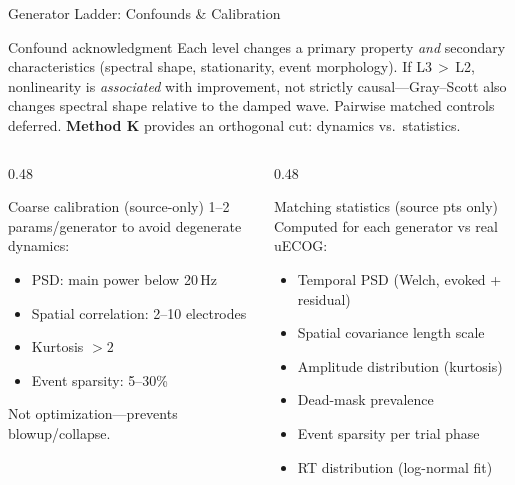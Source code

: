 \documentclass[aspectratio=169, 11pt]{beamer}
\begin{document}

\begin{frame}{Generator Ladder: Confounds \& Calibration}

\begin{alertblock}{Confound acknowledgment}
\small
Each level changes a primary property \emph{and} secondary characteristics (spectral shape, stationarity, event morphology). If L3\,$>$\,L2, nonlinearity is \emph{associated} with improvement, not strictly causal---Gray--Scott also changes spectral shape relative to the damped wave. Pairwise matched controls deferred. \textbf{Method K} provides an orthogonal cut: dynamics vs.\ statistics.
\end{alertblock}

\vspace{0.4em}

\begin{columns}[T]
\begin{column}{0.48\textwidth}
\begin{block}{\small Coarse calibration (source-only)}
\scriptsize
1--2 params/generator to avoid degenerate dynamics:
\begin{itemize}\setlength{\itemsep}{0pt}
  \item PSD: main power below 20\,Hz
  \item Spatial correlation: 2--10 electrodes
  \item Kurtosis $> 2$
  \item Event sparsity: 5--30\%
\end{itemize}
Not optimization---prevents blowup/collapse.
\end{block}
\end{column}
\begin{column}{0.48\textwidth}
\begin{block}{\small Matching statistics (source pts only)}
\scriptsize
Computed for each generator vs real uECOG:
\begin{itemize}\setlength{\itemsep}{0pt}
  \item Temporal PSD (Welch, evoked + residual)
  \item Spatial covariance length scale
  \item Amplitude distribution (kurtosis)
  \item Dead-mask prevalence
  \item Event sparsity per trial phase
  \item RT distribution (log-normal fit)
\end{itemize}
\end{block}
\end{column}
\end{columns}
\end{frame}
\end{document}
